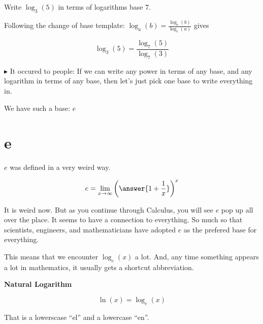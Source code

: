 \documentclass{ximera}
\begin{document}
\begin{example}


Write $\log_3(5)$ in terms of logarithms base $7$.


\begin{explanation}


Following the change of base template: $\log_a(b)  =  \frac{\log_c(b)}{\log_c(a)} $ gives



\[   \log_3(5)  =  \frac{\log_7(5)}{\log_7(3)}         \]



\end{explanation}
\end{example}


















$\blacktriangleright$ It occured to people: If we can write any power in terms of any base, and any logarithm in terms of any base, then let's just pick one base to write everything in.


We have such a base: $e$


\section*{e}



\begin{fact} $e$ was defined in a very weird way.

\[   e = \lim_{x \to \infty}  \left(\answer{1 + \frac{1}{x}}\right)^x      \]

\end{fact}




It is weird now.  But as you continue through Calculus, you will see $e$ pop up all over the place.  It seems to have a connection to everything.  So much so that scientists, engineers, and mathematicians have  adopted $e$ as the prefered base for everything.


This means that we encounter $\log_e(x)$ a lot.  And, any time something appears a lot in mathematics, it usually gets a shortcut abbreviation.




\begin{definition}  \textbf{\textcolor{green!50!black}{Natural Logarithm}} 


\[     \ln(x) = \log_e(x) \]


That is a lowerscase ``el'' and a lowercase ``en''.


\end{definition}
\end{document}
